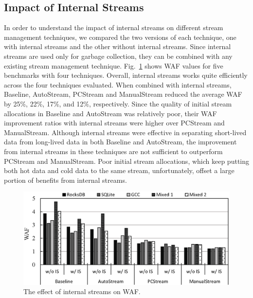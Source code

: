 \subsection{Impact of Internal Streams}

In order to understand the impact of internal streams on different stream
management techniques, we compared 
the two versions of each technique, one with internal streams and the other without internal streams.
Since internal streams are used only for garbage collection, they can be combined with 
any existing stream management technique. 
Fig.~\ref{fig:internal} shows WAF values for five benchmarks with four techniques.
Overall, internal streams works quite efficiently across the four techniques evaluated.   
When combined with internal streams, \textsf{\small Baseline}, \textsf{\small AutoStream}, 
\textsf{\small PCStream} and \textsf{\small ManualStream} reduced the average WAF
by 25\%, 22\%, 17\%, and 12\%, respectively.  
Since the quality of initial stream allocations in \textsf{\small Baseline} and 
\textsf{\small AutoStream} was relatively poor, their WAF improvement ratios 
with internal streams were higher over \textsf{\small PCStream} and \textsf{\small ManualStream}.     
Although internal streams were effective in separating short-lived data from long-lived data 
in both \textsf{\small Baseline} and \textsf{\small AutoStream}, the improvement from internal
streams in these techniques are not sufficient to outperform \textsf{\small PCStream} and 
\textsf{\small ManualStream}. 
Poor initial stream allocations, which keep putting both hot data and cold data to the same stream,
unfortunately, offset a large portion of benefits from internal streams.


\begin{figure}[t]
	\centering
	\includegraphics[width=0.9\linewidth]{figure/internal}
	\caption{The effect of internal streams on WAF.}
	\vspace{-5pt}
	\label{fig:internal}
	\vspace{-15pt}
\end{figure}

